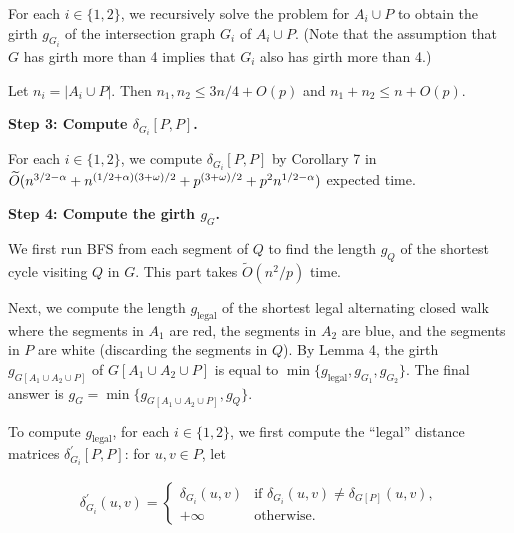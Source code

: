\documentclass[10pt,a4paper]{article}
\begin{document}
For each $i\in\{1,2\}$, we recursively solve the problem for $A_{i}\cup P$ to obtain the girth $g_{G_{i}}$ of the intersection graph $G_{i}$ of $A_{i}\cup P$. (Note that the assumption that $G$ has girth more than 4 implies that $G_{i}$ also has girth more than 4.)
\par
\par
Let $n_{i}=|A_{i}\cup P|$. Then $n_{1},n_{2}\leq 3n/4+O(p)$ and $n_{1}+n_{2}\leq n+O(p)$.
\par
\par
\par\medskip\noindent\textbf{Step 3: Compute $\delta_{G_{i}}[P,P]$.}\par
For each $i\in\{1,2\}$, we compute $\delta_{G_{i}}[P,P]$ by Corollary 7 in $\widetilde{O}(n^{3/2-\alpha}+n^{(1/2+\alpha)(3+\omega)/2}+p^{(3+\omega)/2}+p^{%
2}n^{1/2-\alpha})$ expected time.
\par
\par
\par\medskip\noindent\textbf{Step 4: Compute the girth $g_{G}$.}\par
We first run BFS from each segment of $Q$ to find the length $g_{Q}$ of the shortest cycle visiting $Q$ in $G$. This part takes $\widetilde{O}(n^{2}/p)$ time.
\par
\par
Next, we compute the length $g_{\textrm{legal}}$ of the shortest legal alternating closed walk where the segments in $A_{1}$ are red, the segments in $A_{2}$ are blue, and the segments in $P$ are white (discarding the segments in $Q$). By Lemma 4, the girth $g_{G[A_{1}\cup A_{2}\cup P]}$ of $G[A_{1}\cup A_{2}\cup P]$ is equal to $\min\{g_{\textrm{legal}},g_{G_{1}},g_{G_{2}}\}$. The final answer is $g_{G}=\min\{g_{G[A_{1}\cup A_{2}\cup P]},g_{Q}\}$.
\par
\par
To compute $g_{\textrm{legal}}$, for each $i\in\{1,2\}$, we first compute the “legal” distance matrices $\delta^{\prime}_{G_{i}}[P,P]$: for $u,v\in P$, let
\par
\[\begin{aligned}
\delta^{\prime}_{G_{i}}(u,v)=\begin{cases}\delta_{G_{i}}(u,v)&\text{if }\delta%
_{G_{i}}(u,v)\neq\delta_{G[P]}(u,v),\\
+\infty&\text{otherwise.}\end{cases}
\end{aligned}\]
\end{document}
